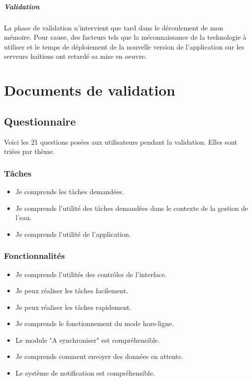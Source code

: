 \documentclass{EPL-master-thesis-covers-FR}
\begin{document}
			\paragraph*{Validation}
			La phase de validation n'intervient que tard dans le déroulement de mon mémoire. Pour cause, des facteurs tels que la méconnaissance de la technologie à utiliser et le temps de déploiement de la nouvelle version de l'application sur les serveurs haïtiens ont retardé sa mise en oeuvre.	
		
		\chapter{Documents de validation}
			\section*{Questionnaire}
				Voici les 21 questions posées aux utilisateurs pendant la validation. Elles sont triées par thème.
				\subsection*{Tâches}
					\begin{itemize}
						\item Je comprends les tâches demandées.
						\item Je comprends l'utilité des tâches demandées dans le contexte de la gestion de l'eau.
						\item Je comprends l'utilité de l'application.
					\end{itemize}
					
				\subsection*{Fonctionnalités}
					\begin{itemize}
						\item Je comprends l'utilités des contrôles de l'interface.
						\item Je peux réaliser les tâches facilement.
						\item Je peux réaliser les tâches rapidement.
						\item Je comprends le fonctionnement du mode hors-ligne.
						\item Le module "A synchroniser" est compréhensible.
						\item Je comprends comment envoyer des données en attente.
						\item Le système de notification est compréhensible.
					\end{itemize}
\end{document}
